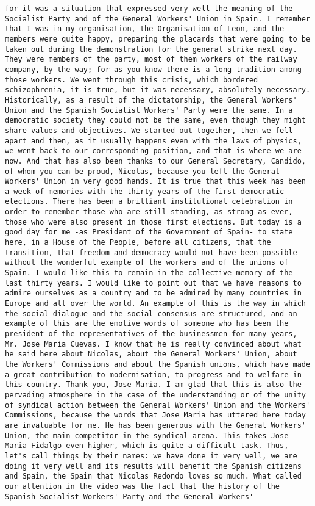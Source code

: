 \documentclass[
]{article}
\begin{document}
\begin{verbatim}
for it was a situation that expressed very well the meaning of the Socialist Party and of the General Workers' Union in Spain. I remember that I was in my organisation, the Organisation of Leon, and the members were quite happy, preparing the placards that were going to be taken out during the demonstration for the general strike next day. They were members of the party, most of them workers of the railway company, by the way; for as you know there is a long tradition among those workers. We went through this crisis, which bordered schizophrenia, it is true, but it was necessary, absolutely necessary. Historically, as a result of the dictatorship, the General Workers' Union and the Spanish Socialist Workers' Party were the same. In a democratic society they could not be the same, even though they might share values and objectives. We started out together, then we fell apart and then, as it usually happens even with the laws of physics, we went back to our corresponding position, and that is where we are now. And that has also been thanks to our General Secretary, Candido, of whom you can be proud, Nicolas, because you left the General Workers' Union in very good hands. It is true that this week has been a week of memories with the thirty years of the first democratic elections. There has been a brilliant institutional celebration in order to remember those who are still standing, as strong as ever, those who were also present in those first elections. But today is a good day for me -as President of the Government of Spain- to state here, in a House of the People, before all citizens, that the transition, that freedom and democracy would not have been possible without the wonderful example of the workers and of the unions of Spain. I would like this to remain in the collective memory of the last thirty years. I would like to point out that we have reasons to admire ourselves as a country and to be admired by many countries in Europe and all over the world. An example of this is the way in which the social dialogue and the social consensus are structured, and an example of this are the emotive words of someone who has been the president of the representatives of the businessmen for many years, Mr. Jose Maria Cuevas. I know that he is really convinced about what he said here about Nicolas, about the General Workers' Union, about the Workers' Commissions and about the Spanish unions, which have made a great contribution to modernisation, to progress and to welfare in this country. Thank you, Jose Maria. I am glad that this is also the pervading atmosphere in the case of the understanding or of the unity of syndical action between the General Workers' Union and the Workers' Commissions, because the words that Jose Maria has uttered here today are invaluable for me. He has been generous with the General Workers' Union, the main competitor in the syndical arena. This takes Jose Maria Fidalgo even higher, which is quite a difficult task. Thus, let's call things by their names: we have done it very well, we are doing it very well and its results will benefit the Spanish citizens and Spain, the Spain that Nicolas Redondo loves so much. What called our attention in the video was the fact that the history of the Spanish Socialist Workers' Party and the General Workers' 
\end{verbatim}
\end{document}
